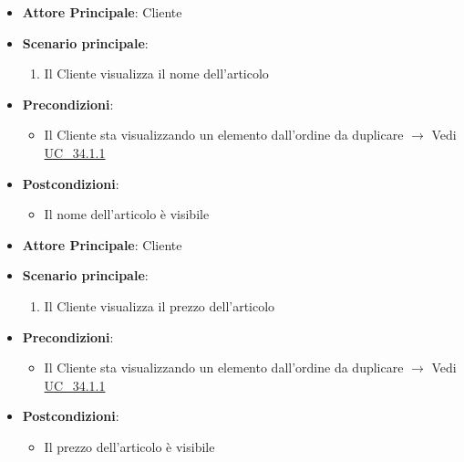 \label{uc_34.1.1.1}
\begin{itemize}
    \item \textbf{Attore Principale}: Cliente
	\item \textbf{Scenario principale}: 
	\begin{enumerate}
		\item Il Cliente visualizza il nome dell'articolo
	\end{enumerate}
	\item \textbf{Precondizioni}: 
	\begin{itemize}
		\item Il Cliente sta visualizzando un elemento dall'ordine da duplicare $\rightarrow$ Vedi \hyperref[uc_34.1.1]{UC\_34.1.1}
	\end{itemize}
	\item \textbf{Postcondizioni}:
	\begin{itemize}
		\item Il nome dell'articolo è visibile
	\end{itemize} 
\end{itemize}

\label{uc_34.1.1.2}
\begin{itemize}
    \item \textbf{Attore Principale}: Cliente
	\item \textbf{Scenario principale}: 
	\begin{enumerate}
		\item Il Cliente visualizza il prezzo dell'articolo
	\end{enumerate}
	\item \textbf{Precondizioni}: 
	\begin{itemize}
		\item Il Cliente sta visualizzando un elemento dall'ordine da duplicare $\rightarrow$ Vedi \hyperref[uc_34.1.1]{UC\_34.1.1}
	\end{itemize}
	\item \textbf{Postcondizioni}:
	\begin{itemize}
		\item Il prezzo dell'articolo è visibile
	\end{itemize} 
\end{itemize}

